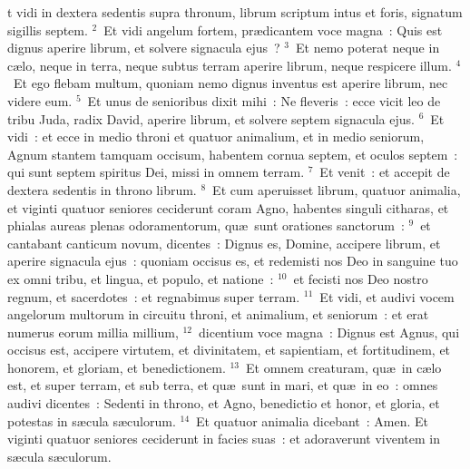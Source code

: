 \bchapter
{}t vidi in dextera sedentis supra thronum, librum scriptum intus et foris, signatum sigillis septem.
${}^{2}$~Et vidi angelum fortem, pr\ae dicantem voce magna~: Quis est dignus aperire librum, et solvere signacula ejus~?
${}^{3}$~Et nemo poterat neque in c\ae lo, neque in terra, neque subtus terram aperire librum, neque respicere illum.
${}^{4}$~Et ego flebam multum, quoniam nemo dignus inventus est aperire librum, nec videre eum.
${}^{5}$~Et unus de senioribus dixit mihi~: Ne fleveris~: ecce vicit leo de tribu Juda, radix David, aperire librum, et solvere septem signacula ejus.
${}^{6}$~Et vidi~: et ecce in medio throni et quatuor animalium, et in medio seniorum, Agnum stantem tamquam occisum, habentem cornua septem, et oculos septem~: qui sunt septem spiritus Dei, missi in omnem terram.
${}^{7}$~Et venit~: et accepit de dextera sedentis in throno librum.
${}^{8}$~Et cum aperuisset librum, quatuor animalia, et viginti quatuor seniores ceciderunt coram Agno, habentes singuli citharas, et phialas aureas plenas odoramentorum, qu\ae\ sunt orationes sanctorum~:
${}^{9}$~et cantabant canticum novum, dicentes~: Dignus es, Domine, accipere librum, et aperire signacula ejus~: quoniam occisus es, et redemisti nos Deo in sanguine tuo ex omni tribu, et lingua, et populo, et natione~:
${}^{10}$~et fecisti nos Deo nostro regnum, et sacerdotes~: et regnabimus super terram.
${}^{11}$~Et vidi, et audivi vocem angelorum multorum in circuitu throni, et animalium, et seniorum~: et erat numerus eorum millia millium,
${}^{12}$~dicentium voce magna~: Dignus est Agnus, qui occisus est, accipere virtutem, et divinitatem, et sapientiam, et fortitudinem, et honorem, et gloriam, et benedictionem.
${}^{13}$~Et omnem creaturam, qu\ae\ in c\ae lo est, et super terram, et sub terra, et qu\ae\ sunt in mari, et qu\ae\ in eo~: omnes audivi dicentes~: Sedenti in throno, et Agno, benedictio et honor, et gloria, et potestas in s\ae cula s\ae culorum.
${}^{14}$~Et quatuor animalia dicebant~: Amen. Et viginti quatuor seniores ceciderunt in facies suas~: et adoraverunt viventem in s\ae cula s\ae culorum.

